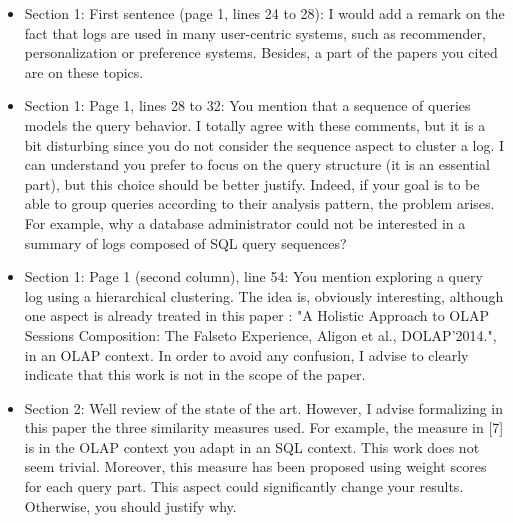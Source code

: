 \begin{itemize}

\item Section 1: First sentence (page 1, lines 24 to 28): I would add a remark on the fact that logs are used in many user-centric systems, such as recommender, personalization or preference systems. Besides, a part of the papers you cited are on these topics.


\item Section 1: Page 1, lines 28 to 32: You mention that a sequence of queries models the query behavior. I totally agree with these comments, but it is a bit disturbing since you do not consider the sequence aspect to cluster a log. I can understand you prefer to focus on the query structure (it is an essential part), but this choice should be better justify. Indeed, if your goal is to be able to group queries according to their analysis pattern, the problem arises. For example, why a database administrator could not be interested in a summary of logs composed of SQL query sequences?


\item Section 1: Page 1 (second column), line 54: You mention exploring a query log using a hierarchical clustering. The idea is, obviously interesting, although one aspect is already treated in this paper : "A Holistic Approach to OLAP Sessions Composition: The Falseto Experience, Aligon et al., DOLAP'2014.", in an OLAP context. In order to avoid any confusion, I advise to clearly indicate that this work is not in the scope of the paper.


\item Section 2: Well review of the state of the art.
However, I advise formalizing in this paper the three similarity measures used. For example, the measure in [7] is in the OLAP context you adapt in an SQL context. This work does not seem trivial. Moreover, this measure has been proposed using weight scores for each query part. This aspect could significantly change your results. Otherwise, you should justify why.


\end{itemize}
